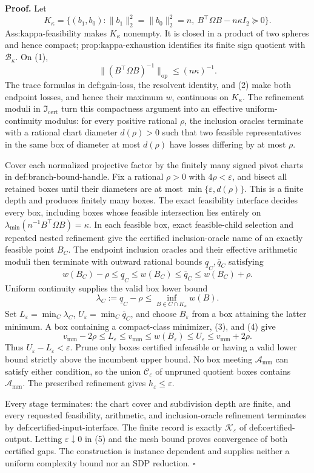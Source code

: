 \textbf{Proof.}
Let
\[
K_\kappa=\{(b_1,b_0):\lVert b_1\rVert_2^2=\lVert b_0\rVert_2^2=n,
\ B^{\top}\Omega B-n\kappa I_2\succeq0\}.
\tag{1}
\]
Ass:kappa-feasibility makes \(K_\kappa\) nonempty.  It is closed in a product of two spheres and hence compact; prop:kappa-exhaustion identifies its finite sign quotient with \(\mathcal B_\kappa\).  On (1),
\[
\lVert(B^{\top}\Omega B)^{-1}\rVert_{\mathrm{op}}\le(n\kappa)^{-1}.
\tag{2}
\]
The trace formulas in def:gain-loss, the resolvent identity, and (2) make both endpoint losses, and hence their maximum \(w\), continuous on \(K_\kappa\).  The refinement moduli in \(\mathfrak I_{\mathrm{cert}}\) turn this compactness argument into an effective uniform-continuity modulus: for every positive rational \(\rho\), the inclusion oracles terminate with a rational chart diameter \(d(\rho)>0\) such that two feasible representatives in the same box of diameter at most \(d(\rho)\) have losses differing by at most \(\rho\).

Cover each normalized projective factor by the finitely many signed pivot charts in def:branch-bound-handle.  Fix a rational \(\rho>0\) with \(4\rho<\varepsilon\), and bisect all retained boxes until their diameters are at most \(\min\{\varepsilon,d(\rho)\}\).  This is a finite depth and produces finitely many boxes.  The exact feasibility interface decides every box, including boxes whose feasible intersection lies entirely on
\(\lambda_{\min}(n^{-1}B^{\top}\Omega B)=\kappa\).  In each feasible box, exact feasible-child selection and repeated nested refinement give the certified inclusion-oracle name of an exactly feasible point \(B_C\).  The endpoint inclusion oracles and their effective arithmetic moduli then terminate with outward rational bounds \(\underline q_C,\overline q_C\) satisfying
\[
w(B_C)-\rho\le\underline q_C\le w(B_C)
\le\overline q_C\le w(B_C)+\rho.
\tag{3}
\]
Uniform continuity supplies the valid box lower bound
\[
\lambda_C:=\underline q_C-\rho
\le\inf_{B\in C\cap K_\kappa}w(B).
\tag{4}
\]
Set \(L_\varepsilon=\min_C\lambda_C\), \(U_\varepsilon=\min_C\overline q_C\), and choose \(B_\varepsilon\) from a box attaining the latter minimum.  A box containing a compact-class minimizer, (3), and (4) give
\[
v_{\mathrm{mm}}-2\rho\le L_\varepsilon\le v_{\mathrm{mm}}
\le w(B_\varepsilon)\le U_\varepsilon\le v_{\mathrm{mm}}+2\rho.
\tag{5}
\]
Thus \(U_\varepsilon-L_\varepsilon<\varepsilon\).  Prune only boxes certified infeasible or having a valid lower bound strictly above the incumbent upper bound.  No box meeting \(\mathcal A_{\mathrm{mm}}\) can satisfy either condition, so the union \(\mathcal C_\varepsilon\) of unpruned quotient boxes contains \(\mathcal A_{\mathrm{mm}}\).  The prescribed refinement gives \(h_\varepsilon\le\varepsilon\).

Every stage terminates: the chart cover and subdivision depth are finite, and every requested feasibility, arithmetic, and inclusion-oracle refinement terminates by def:certified-input-interface.  The finite record is exactly \(\mathscr K_\varepsilon\) of def:certified-output.  Letting \(\varepsilon\downarrow0\) in (5) and the mesh bound proves convergence of both certified gaps.  The construction is instance dependent and supplies neither a uniform complexity bound nor an SDP reduction. \(\square\)
